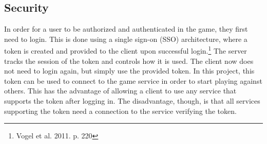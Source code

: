 \subsection{Security}
In order for a user to be authorized and authenticated in the game,
they first need to login. This is done using a single sign-on (SSO)
architecture, where a token is created and provided to the client upon
successful login.\footnote{Vogel et al. 2011. p. 220} The server tracks
the session of the token and controls how it is used. The client now does
not need to login again, but simply use the provided token. In this project,
this token can be used to connect to the game service in order to start
 playing against others. This has the advantage of allowing a client to
  use any service that supports the token after logging in. The disadvantage,
   though, is that all services supporting the token need a connection to
   the service verifying the token.
\\
